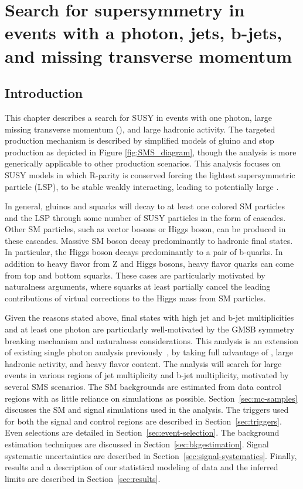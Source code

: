 \chapter[SUSY search with photon]{Search for supersymmetry in events with a photon, jets, b-jets, and missing transverse momentum}
\label{Chap3}
\section{Introduction}
This chapter describes a search for SUSY in events with one photon, large missing transverse momentum (\ptmiss), 
and large hadronic activity.  The targeted production mechanism is described by simplified models of gluino and stop
production as depicted in Figure \ref{fig:SMS_diagram}, though the analysis is 
more generically applicable to other production scenarios.  This analysis
focuses on SUSY models in which R-parity is conserved forcing the lightest supersymmetric particle (LSP), to 
be stable weakly interacting, leading to potentially large \ptmiss.  

In general, gluinos and squarks will decay to at least one colored SM particles and the LSP through some number of
SUSY particles in the form of cascades.  Other SM particles, such as vector bosons or Higgs boson, can be 
produced in these cascades.  Massive SM boson decay predominantly to hadronic final states.  In particular, 
the Higgs boson decays predominantly to a pair of b-quarks.  In addition to heavy flavor from Z and Higgs bosons, 
heavy flavor quarks can come from top and bottom squarks.  These cases are particularly motivated by naturalness 
arguments, where squarks at least partially cancel the leading contributions of virtual corrections to the 
Higgs mass from SM particles.  

Given the reasons stated above, final states with high jet and b-jet multiplicities and at least one photon
are particularly well-motivated by the GMSB symmetry breaking mechanism and naturalness considerations.
This analysis is an extension of existing single photon analysis previously~\cite{Sirunyan:2017yse}, by taking full advantage
of \ptmiss, large hadronic activity, and heavy flavor content.  The analysis will search for large \ptmiss events
in various regions of jet multiplicity and b-jet multiplicity, motivated by several SMS scenarios.  The 
SM backgrounds are estimated from data control regions with as little reliance on simulations as possible.
Section~\ref{sec:mc-samples} discusses the SM and signal simulations used in the analysis.
The triggers used for both the signal and control regions are described in Section~\ref{sec:triggers}.   
Even selections are detailed in Section~\ref{sec:event-selection}. The background 
estimation techniques are discussed in Section~\ref{sec:bkgestimation}.  Signal systematic uncertainties are described in Section~\ref{sec:signal-systematics}.
Finally, results and a description of our statistical modeling of data and the inferred limits are described 
in Section~\ref{sec:results}.

